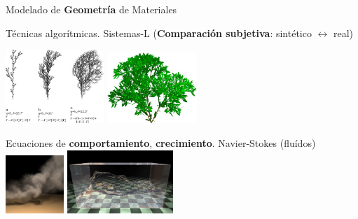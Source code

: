 \documentclass[spanish,unknownkeysallowed,10pt]{beamer}
\begin{document}
\begin{frame}{}

Modelado de \textbf{Geometría} de Materiales

\begin{block}{}
Técnicas algorítmicas. Sistemas-L (\textbf{Comparación subjetiva}: sintético $\leftrightarrow$ real)

\center

\includegraphics[width=3.7cm]{../figures/sistemalcorchete}
\includegraphics[width=3.4cm]{../figures/3dlsystem}

\end{block}
\begin{block}{}

Ecuaciones de \textbf{comportamiento}, \textbf{crecimiento}. Navier-Stokes (fluídos)
\center
\includegraphics[width=2.2cm]{../figures/smoke}
\includegraphics[width=4cm]{../figures/water}
\end{block}

\end{frame}
\end{document}
